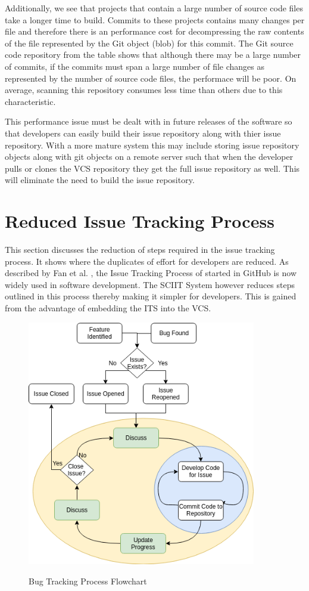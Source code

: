 \documentclass{mproj}
\begin{document}
Additionally, we see that projects that contain a large number of source code files take a longer time to build. Commits to these projects contains many changes per file and therefore there is an performance cost for decompressing the raw contents of the file represented by the Git object (blob) for this commit. The Git source code repository from the table shows that although there may be a large number of commits, if the commits must span a large number of file changes as represented by the number of source code files, the performace will be poor. On average, scanning this repository consumes less time than others due to this characteristic.

This performance issue must be dealt with in future releases of the software so that developers can easily build their issue repository along with thier issue repository. With a more mature system this may include storing issue repository objects along with git objects on a remote server such that when the developer pulls or clones the VCS repository they get the full issue repository as well. This will eliminate the need to build the issue repository.

\section{Reduced Issue Tracking Process}

This section discusses the reduction of steps required in the issue tracking process. It shows where the duplicates of effort for developers are reduced. As described by Fan et al. \cite{Fan:2017}, the Issue Tracking Process of started in GitHub is now widely used in software development. The SCIIT System however reduces steps outlined in this process thereby making it simpler for developers. This is gained from the advantage of embedding the ITS into the VCS.

\begin{figure}
\centering
  \caption{Bug Tracking Process Flowchart}
  \includegraphics[width=10cm]{process-flowchart}
  \label{fig:process-flowchart}
\end{figure}
\end{document}
